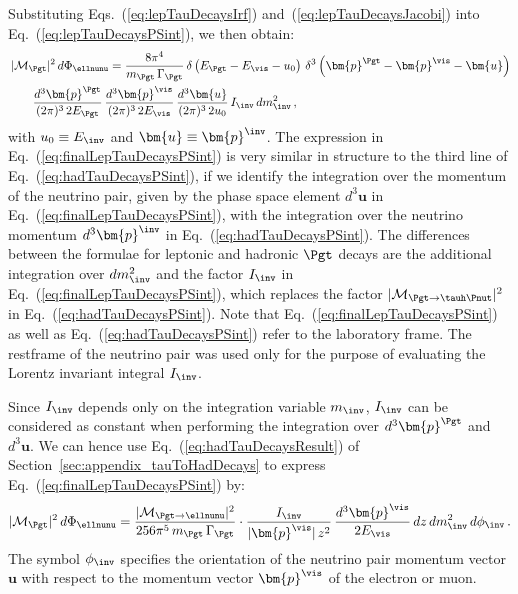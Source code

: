Substituting Eqs.~(\ref{eq:lepTauDecaysIrf})
and~(\ref{eq:lepTauDecaysJacobi}) into
Eq.~(\ref{eq:lepTauDecaysPSint}), we then obtain:
\begin{equation}
\begin{aligned}
& \, \vert\mathcal{M}_{\Pgt}\vert^{2} \,
 d\Phi_{\ellnunu} = \frac{8\pi^{4}}{m_{\Pgt} \, \Gamma_{\Pgt}} \,
 \delta \left( E_{\Pgt} - E_{\vis} - u_{0} \right)
 \, \delta^{3} \left( \bm{p}^{\Pgt} - \bm{p}^{\vis} -
  \bm{u} \right) \\
& \qquad \frac{d^{3}\bm{p}^{\Pgt}}{(2\pi)^{3} \, 2 E_{\Pgt}} \,
  \frac{d^{3}\bm{p}^{\vis}}{(2\pi)^{3} \, 2 E_{\vis}} \, 
  \frac{d^{3}\bm{u}}{(2\pi)^{3} \, 2 u_{0}} \, I_{\inv} \,
  dm^{2}_{\inv} \, ,
\end{aligned}
\label{eq:finalLepTauDecaysPSint}
\end{equation}
with $u_{0} \equiv E_{\inv}$ and $\bm{u} \equiv \bm{p}^{\inv}$.
The expression in Eq.~(\ref{eq:finalLepTauDecaysPSint}) is very similar in structure to the third line of Eq.~(\ref{eq:hadTauDecaysPSint}),
if we identify the integration over the momentum of the neutrino pair,
given by the phase space element $d^{3}\bm{u}$ in Eq.~(\ref{eq:finalLepTauDecaysPSint}), 
with the integration over the neutrino momentum $d^{3}\bm{p}^{\inv}$ in Eq.~(\ref{eq:hadTauDecaysPSint}).
The differences between the formulae for leptonic and hadronic $\Pgt$ decays
are the additional integration over $dm^{2}_{\inv}$ and the
factor $I_{\inv}$ in Eq.~(\ref{eq:finalLepTauDecaysPSint}), which replaces the
factor $\vert\mathcal{M}_{\Pgt \to
  \tauh\Pnut}\vert^{2}$ in Eq.~(\ref{eq:hadTauDecaysPSint}).
Note that Eq.~(\ref{eq:finalLepTauDecaysPSint}) as well as Eq.~(\ref{eq:hadTauDecaysPSint}) refer to the laboratory frame.
The restframe of the neutrino pair was used only for the purpose of evaluating the Lorentz invariant integral $I_{\inv}$.

Since $I_{\inv}$ depends only on the integration variable $m_{\inv}$, 
$I_{\inv}$ can be considered as constant when performing the integration over $d^{3}\bm{p}^{\Pgt}$ and $d^{3}\bm{u}$.
We can hence use Eq.~(\ref{eq:hadTauDecaysResult}) of Section~\ref{sec:appendix_tauToHadDecays} to express Eq.~(\ref{eq:finalLepTauDecaysPSint}) by:
\begin{align}
\vert\mathcal{M}_{\Pgt}\vert^{2} \,
 d\Phi_{\ellnunu} = \frac{\vert\mathcal{M}_{\Pgt \to
  \ellnunu}\vert^{2}}{256\pi^{5}\, m_{\Pgt} \, \Gamma_{\Pgt}} \cdot 
    \frac{I_{\inv}}{\vert\bm{p}^{\vis}\vert \, z^{2}} \, 
    \frac{d^{3}\bm{p}^{\vis}}{2 E_{\vis}} \, dz \, dm^{2}_{\inv} \,
    d\phi_{\inv} \, .
\label{eq:lepTauDecaysResult}
\end{align}
The symbol $\phi_{\inv}$ specifies the orientation of the neutrino
pair momentum vector $\bm{u}$ with respect to the momentum vector $\bm{p}^{\vis}$
of the electron or muon.

